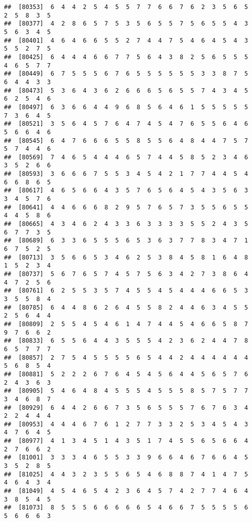 \documentclass[
]{book}
\begin{document}
\begin{verbatim}
##  [80353]  6  4  4  2  5  4  5  5  7  7  6  6  7  6  2  3  5  6  5  2  5  8  3  5
##  [80377]  4  2  8  6  5  7  5  3  5  6  5  5  7  5  6  5  5  4  3  5  6  3  4  5
##  [80401]  4  6  4  6  6  5  5  2  7  4  4  7  5  4  6  4  5  4  3  5  5  2  7  5
##  [80425]  6  4  4  4  6  6  7  7  5  6  4  3  8  2  5  6  5  5  5  4  6  5  7  7
##  [80449]  6  7  5  5  5  6  7  6  5  5  5  5  5  5  3  3  8  7  5  6  4  4  3  3
##  [80473]  5  3  6  4  3  6  2  6  6  6  5  6  5  5  7  4  3  4  5  6  2  5  4  6
##  [80497]  6  3  6  6  4  4  9  6  8  5  6  4  6  1  5  5  5  5  5  7  3  6  4  5
##  [80521]  3  5  6  4  5  7  6  4  7  4  5  4  7  6  5  5  6  4  6  5  6  6  4  6
##  [80545]  6  4  7  6  6  6  5  5  8  5  5  6  4  8  4  4  7  5  7  5  7  4  4  6
##  [80569]  7  4  6  5  4  4  4  6  5  7  4  4  5  8  5  2  3  4  6  3  5  2  6  6
##  [80593]  3  6  6  6  7  5  5  3  4  5  4  2  1  7  7  4  4  5  4  6  6  8  6  5
##  [80617]  4  6  5  6  6  4  3  5  7  6  5  6  4  5  4  3  5  6  3  3  4  5  7  6
##  [80641]  4  4  6  6  6  8  2  9  5  7  6  5  7  3  5  5  6  5  5  4  4  5  8  6
##  [80665]  4  3  4  6  2  4  3  3  6  3  3  3  3  5  5  2  4  3  5  6  7  7  3  5
##  [80689]  6  3  3  6  5  5  5  6  5  3  6  3  7  7  8  3  4  7  1  6  7  5  2  5
##  [80713]  3  5  6  6  5  3  4  6  2  5  3  8  4  5  8  1  6  4  8  1  5  2  3  4
##  [80737]  5  6  7  6  5  7  4  5  7  5  6  3  4  2  7  3  8  6  4  4  7  2  5  6
##  [80761]  6  2  5  5  3  5  7  4  5  5  4  5  4  4  4  6  6  5  3  3  5  5  8  4
##  [80785]  6  4  4  8  6  2  6  4  5  5  8  2  4  4  6  3  4  5  5  2  5  6  4  4
##  [80809]  2  5  5  4  5  4  6  1  4  7  4  4  5  4  6  6  5  8  7  9  7  6  6  2
##  [80833]  6  5  5  6  4  4  3  5  5  5  4  2  3  6  2  4  4  7  8  6  5  7  7  7
##  [80857]  2  7  5  4  5  5  5  5  6  5  4  4  2  4  4  4  4  4  4  5  6  8  5  4
##  [80881]  5  2  2  2  6  7  6  4  5  4  5  6  4  4  5  6  5  7  6  2  4  3  6  3
##  [80905]  5  4  6  4  8  4  5  5  5  4  5  5  5  8  5  7  5  7  7  3  4  6  8  7
##  [80929]  6  4  4  2  6  6  7  3  5  6  5  5  5  7  6  7  6  3  4  2  2  4  4  4
##  [80953]  4  4  4  6  7  6  1  2  7  7  3  3  2  5  3  4  5  4  3  4  7  6  4  5
##  [80977]  4  1  3  4  5  1  4  3  5  1  7  4  5  5  6  5  6  6  4  2  7  6  6  2
##  [81001]  3  3  3  4  6  5  5  3  3  9  6  6  4  6  7  6  6  4  5  3  5  2  8  5
##  [81025]  4  4  3  2  3  5  5  6  5  4  6  8  8  7  4  1  4  7  5  4  6  4  3  4
##  [81049]  4  5  4  6  5  4  2  3  6  4  5  7  4  2  7  7  4  6  4  3  8  5  4  5
##  [81073]  8  5  5  5  6  6  6  6  6  5  4  6  6  7  5  5  5  5  6  5  6  6  6  3

\end{verbatim}
\end{document}

